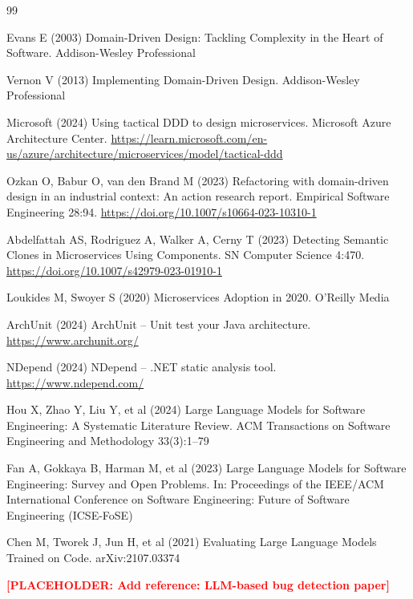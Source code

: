 \documentclass[smallextended]{svjour3}
\newcommand{\placeholder}[1]{\textcolor{red}{\textbf{[PLACEHOLDER: #1]}}}
\begin{document}
\begin{thebibliography}{99}

Evans E (2003) Domain-Driven Design: Tackling Complexity in the Heart of Software. Addison-Wesley Professional

Vernon V (2013) Implementing Domain-Driven Design. Addison-Wesley Professional

Microsoft (2024) Using tactical DDD to design microservices. Microsoft Azure Architecture Center. \url{https://learn.microsoft.com/en-us/azure/architecture/microservices/model/tactical-ddd}

Ozkan O, Babur O, van den Brand M (2023) Refactoring with domain-driven design in an industrial context: An action research report. Empirical Software Engineering 28:94. \url{https://doi.org/10.1007/s10664-023-10310-1}

Abdelfattah AS, Rodriguez A, Walker A, Cerny T (2023) Detecting Semantic Clones in Microservices Using Components. SN Computer Science 4:470. \url{https://doi.org/10.1007/s42979-023-01910-1}

Loukides M, Swoyer S (2020) Microservices Adoption in 2020. O'Reilly Media

ArchUnit (2024) ArchUnit -- Unit test your Java architecture. \url{https://www.archunit.org/}

NDepend (2024) NDepend -- .NET static analysis tool. \url{https://www.ndepend.com/}

Hou X, Zhao Y, Liu Y, et al (2024) Large Language Models for Software Engineering: A Systematic Literature Review. ACM Transactions on Software Engineering and Methodology 33(3):1--79

Fan A, Gokkaya B, Harman M, et al (2023) Large Language Models for Software Engineering: Survey and Open Problems. In: Proceedings of the IEEE/ACM International Conference on Software Engineering: Future of Software Engineering (ICSE-FoSE)

Chen M, Tworek J, Jun H, et al (2021) Evaluating Large Language Models Trained on Code. arXiv:2107.03374

\placeholder{Add reference: LLM-based bug detection paper}


\end{thebibliography}
\end{document}
